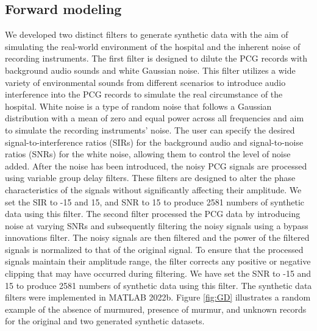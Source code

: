 \documentclass{article}
\begin{document}
\subsection{Forward modeling}
We developed two distinct filters to generate synthetic data with the aim of simulating the real-world environment of the hospital and the inherent noise of recording instruments. The first filter is designed to dilute the PCG records with background audio sounds and white Gaussian noise. This filter utilizes a wide variety of environmental sounds from different scenarios to introduce audio interference into the PCG records to simulate the real circumstance of the hospital. White noise is a type of random noise that follows a Gaussian distribution with a mean of zero and equal power across all frequencies and aim to simulate the recording instruments' noise. The user can specify the desired signal-to-interference ratios (SIRs) for the background audio and signal-to-noise ratios (SNRs) for the white noise, allowing them to control the level of noise added. After the noise has been introduced, the noisy PCG signals are processed using variable group delay filters. These filters are designed to alter the phase characteristics of the signals without significantly affecting their amplitude. We set the SIR to -15 and 15, and SNR to 15 to produce 2581 numbers of synthetic data using this filter. The second filter processed the PCG data by introducing noise at varying SNRs and subsequently filtering the noisy signals using a bypass innovations filter. The noisy signals are then filtered and the power of the filtered signals is normalized to that of the original signal. To ensure that the processed signals maintain their amplitude range, the filter corrects any positive or negative clipping that may have occurred during filtering. We have set the SNR to -15 and 15 to produce 2581 numbers of synthetic data using this filter. The synthetic data filters were implemented in MATLAB 2022b. Figure \ref{fig:GD} illustrates a random example of the absence of murmured, presence of murmur, and unknown records for the original and two generated synthetic datasets.
\end{document}
